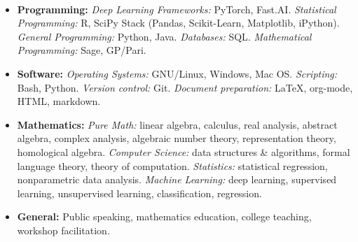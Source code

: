 \documentclass[10pt]{article}
\begin{document}
\vspace{-0.4in}
\tabto{18.9cm}
{   
\\




\spacedhrule{0.5em}{-0.4em}


\begin{itemize}
  \item \textbf{Programming:} \textit{Deep Learning Frameworks:} PyTorch, Fast.AI. \textit{Statistical Programming:} R, SciPy Stack (Pandas, Scikit-Learn, Matplotlib, iPython). \textit{General Programming:} Python, Java. \textit{Databases:} SQL.  \textit{Mathematical Programming:} Sage, GP/Pari. 
  \item \textbf{Software:} \textit{Operating Systems:} GNU/Linux, Windows, Mac OS. \textit{Scripting:} Bash, Python. \textit{Version control:} Git. \textit{Document preparation:} \LaTeX, org-mode, HTML, markdown.
   \item \textbf{Mathematics:}
   \emph{Pure Math:} linear algebra, calculus, real analysis, abstract algebra, complex analysis, algebraic number theory, representation theory, homological algebra.
   \emph{Computer Science:} data structures \& algorithms, formal language theory, theory of computation. 
   \emph{Statistics:} statistical regression, nonparametric data analysis.
   \emph{Machine Learning:} deep learning, supervised learning, unsupervised learning, classification, regression.
   \item \textbf{General:} Public speaking, mathematics education, college teaching, workshop facilitation.
 \end{itemize}

}
\end{document}
